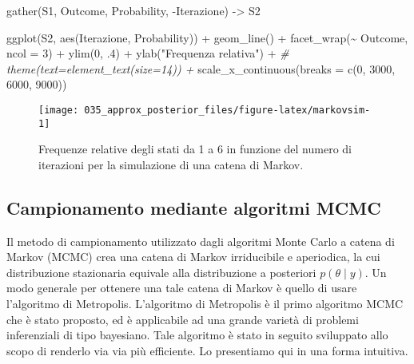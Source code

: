 \documentclass[
]{memoir}
\newenvironment{Shaded}{\begin{snugshade}}{\end{snugshade}}
\newcommand{\AttributeTok}[1]{\textcolor[rgb]{0.77,0.63,0.00}{#1}}
\newcommand{\CommentTok}[1]{\textcolor[rgb]{0.56,0.35,0.01}{\textit{#1}}}
\newcommand{\DecValTok}[1]{\textcolor[rgb]{0.00,0.00,0.81}{#1}}
\newcommand{\FunctionTok}[1]{\textcolor[rgb]{0.00,0.00,0.00}{#1}}
\newcommand{\NormalTok}[1]{#1}
\newcommand{\OtherTok}[1]{\textcolor[rgb]{0.56,0.35,0.01}{#1}}
\newcommand{\SpecialCharTok}[1]{\textcolor[rgb]{0.00,0.00,0.00}{#1}}
\newcommand{\StringTok}[1]{\textcolor[rgb]{0.31,0.60,0.02}{#1}}
\begin{document}
\begin{Shaded}
\begin{Highlighting}[]
\FunctionTok{gather}\NormalTok{(S1, Outcome, Probability, }\SpecialCharTok{{-}}\NormalTok{Iterazione) }\OtherTok{{-}\textgreater{}}\NormalTok{ S2}

\FunctionTok{ggplot}\NormalTok{(S2, }\FunctionTok{aes}\NormalTok{(Iterazione, Probability)) }\SpecialCharTok{+}
  \FunctionTok{geom\_line}\NormalTok{() }\SpecialCharTok{+}
  \FunctionTok{facet\_wrap}\NormalTok{(}\SpecialCharTok{\textasciitilde{}}\NormalTok{ Outcome, }\AttributeTok{ncol =} \DecValTok{3}\NormalTok{) }\SpecialCharTok{+}
  \FunctionTok{ylim}\NormalTok{(}\DecValTok{0}\NormalTok{, .}\DecValTok{4}\NormalTok{) }\SpecialCharTok{+}
  \FunctionTok{ylab}\NormalTok{(}\StringTok{"Frequenza relativa"}\NormalTok{) }\SpecialCharTok{+}
  \CommentTok{\# theme(text=element\_text(size=14))  +}
  \FunctionTok{scale\_x\_continuous}\NormalTok{(}\AttributeTok{breaks =} \FunctionTok{c}\NormalTok{(}\DecValTok{0}\NormalTok{, }\DecValTok{3000}\NormalTok{, }\DecValTok{6000}\NormalTok{, }\DecValTok{9000}\NormalTok{))}
\end{Highlighting}
\end{Shaded}

\begin{figure}

{\centering \texttt{[image: 035\_approx\_posterior\_files/figure-latex/markovsim-1]} 

}

\caption{Frequenze relative degli stati da 1 a 6 in funzione del numero di iterazioni per la simulazione di una catena di Markov.}\label{fig:markovsim}
\end{figure}

\hypertarget{campionamento-mediante-algoritmi-mcmc}{%
\subsection{Campionamento mediante algoritmi MCMC}\label{campionamento-mediante-algoritmi-mcmc}}

Il metodo di campionamento utilizzato dagli algoritmi Monte Carlo a catena di Markov (MCMC) crea una catena di Markov irriducibile e aperiodica, la cui distribuzione stazionaria equivale alla distribuzione a posteriori \(p(\theta \mid y)\). Un modo generale per ottenere una tale catena di Markov è quello di usare l'algoritmo di Metropolis. L'algoritmo di Metropolis è il primo algoritmo MCMC che è stato proposto, ed è applicabile ad una grande varietà di problemi inferenziali di tipo bayesiano. Tale algoritmo è stato in seguito sviluppato allo scopo di renderlo via via più efficiente. Lo presentiamo qui in una forma intuitiva.
\end{document}
